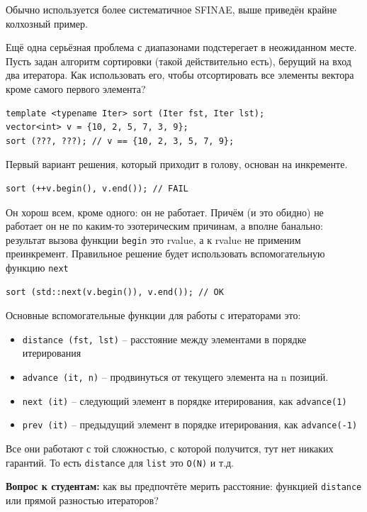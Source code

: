 \documentclass[a4paper,12pt,oneside]{article}
\begin{document}
Обычно используется более систематичное SFINAE, выше приведён крайне колхозный пример.

Ещё одна серьёзная проблема с диапазонами подстерегает в неожиданном месте. Пусть задан алгоритм сортировки (такой действительно есть), берущий на вход два итератора. Как использовать его, чтобы отсортировать все элементы вектора кроме самого первого элемента?

\begin{lstlisting}
template <typename Iter> sort (Iter fst, Iter lst);
vector<int> v = {10, 2, 5, 7, 3, 9};
sort (???, ???); // v == {10, 2, 3, 5, 7, 9};
\end{lstlisting}

Первый вариант решения, который приходит в голову, основан на инкременте.

\begin{lstlisting}
sort (++v.begin(), v.end()); // FAIL
\end{lstlisting}

Он хорош всем, кроме одного: он не работает. Причём (и это обидно) не работает он не по каким-то эзотерическим причинам, а вполне банально: результат вызова функции \lstinline!begin! это rvalue, а к rvalue не применим преинкремент. Правильное решение будет использовать вспомогательную функцию \lstinline!next!

\begin{lstlisting}
sort (std::next(v.begin()), v.end()); // OK
\end{lstlisting}

Основные вспомогательные функции для работы с итераторами это:

\begin{itemize}
\item \lstinline!distance (fst, lst)! – расстояние между элементами в порядке итерирования
\item \lstinline!advance (it, n)! – продвинуться от текущего элемента на n позиций.
\item \lstinline!next (it)! – следующий элемент в порядке итерирования, как \lstinline!advance(1)!
\item \lstinline!prev (it)! – предыдущий элемент в порядке итерирования, как \lstinline!advance(-1)!
\end{itemize}

Все они работают с той сложностью, с которой получится, тут нет никаких гарантий. То есть \lstinline!distance! для \lstinline!list! это \lstinline!O(N)! и т.д.

\textbf{Вопрос к студентам:} как вы предпочтёте мерить расстояние: функцией \lstinline!distance! или прямой разностью итераторов?
\end{document}
